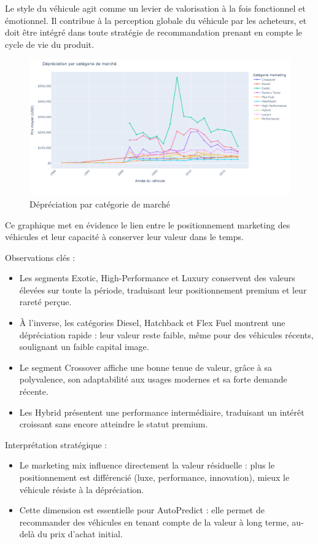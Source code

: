 \documentclass[12pt]{report}
\begin{document}
\vspace{1em}
Le style du véhicule agit comme un levier de valorisation à la fois fonctionnel et émotionnel. Il contribue à la perception globale du véhicule par les acheteurs, et doit être intégré dans toute stratégie de recommandation prenant en compte le cycle de vie du produit.

\begin{figure}[H]
    \centering
    \includegraphics[width=1\textwidth]{annee_prix_cat.png}
    \caption{Dépréciation par catégorie de marché}
    \label{fig:annee-prix-cat}
\end{figure}

Ce graphique met en évidence le lien entre le positionnement marketing des véhicules et leur capacité à conserver leur valeur dans le temps.

\vspace{0.5em}
Observations clés :
\begin{itemize}
    \item Les segments Exotic, High-Performance et Luxury conservent des valeurs élevées sur toute la période, traduisant leur positionnement premium et leur rareté perçue.
    \item À l’inverse, les catégories Diesel, Hatchback et Flex Fuel montrent une dépréciation rapide : leur valeur reste faible, même pour des véhicules récents, soulignant un faible capital image.
    \item Le segment Crossover affiche une bonne tenue de valeur, grâce à sa polyvalence, son adaptabilité aux usages modernes et sa forte demande récente.
    \item Les Hybrid présentent une performance intermédiaire, traduisant un intérêt croissant sans encore atteindre le statut premium.
\end{itemize}

\vspace{0.5em}
Interprétation stratégique :
\begin{itemize}
    \item Le marketing mix influence directement la valeur résiduelle : plus le positionnement est différencié (luxe, performance, innovation), mieux le véhicule résiste à la dépréciation.
    \item Cette dimension est essentielle pour AutoPredict : elle permet de recommander des véhicules en tenant compte de la valeur à long terme, au-delà du prix d’achat initial.
\end{itemize}
\end{document}
